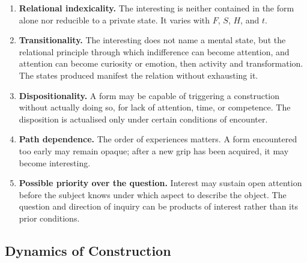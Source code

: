 \documentclass[11pt,a4paper]{article}
\begin{document}
\begin{enumerate}
  \item \textbf{Relational indexicality.} The interesting is neither contained
        in the form alone nor reducible to a private state. It varies with
        \(F\), \(S\), \(H\), and \(t\).
  \item \textbf{Transitionality.} The interesting does not name a mental state,
        but the relational principle through which indifference can become
        attention, and attention can become curiosity or emotion, then activity and
        transformation. The states produced manifest the relation without
        exhausting it.
  \item \textbf{Dispositionality.} A form may be capable of triggering a
        construction without actually doing so, for lack of attention, time, or
        competence. The disposition is actualised only under certain conditions
        of encounter.
  \item \textbf{Path dependence.} The order of experiences matters. A form
        encountered too early may remain opaque; after a new grip has been
        acquired, it may become interesting.
  \item \textbf{Possible priority over the question.} Interest may sustain
        open attention before the subject knows under which aspect to describe
        the object. The question and direction of inquiry can be products of
        interest rather than its prior conditions.
\end{enumerate}

\subsection{Dynamics of Construction}
\end{document}
